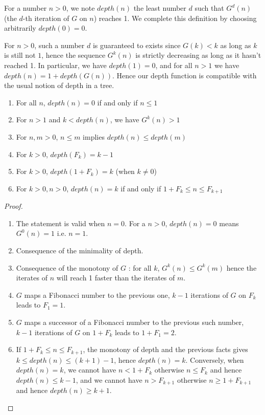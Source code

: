 \documentclass[a4paper,11pt]{article}
\begin{document}
\begin{definition}
For a number $n>0$, we note $depth(n)$ the least number $d$ such that
$G^d(n)$ (the $d$-th iteration of $G$ on $n$) reaches 1.
We complete this definition by choosing arbitrarily $depth(0)=0$.
\end{definition}

For $n>0$, such a number $d$ is guaranteed to exists since $G(k)<k$ as long as
$k$ is still not $1$, hence the sequence $G^k(n)$ is strictly
decreasing as long as it hasn't reached 1.
In particular, we have $depth(1)=0$, and for all $n>1$ we have
$depth(n) = 1+depth(G(n))$. Hence our depth function is compatible
with the usual notion of depth in a tree.

\begin{theorem}\label{depthprops}
\noindent
\begin{enumerate}
\item For all $n$, $depth(n)=0$ if and only if $n\le 1$
\item For $n>1$ and $k<depth(n)$, we have $G^k(n) > 1$
\item For $n,m>0$, $n\le m$ implies $depth(n)\le depth(m)$
\item For $k>0$, $depth(F_k) = k-1$
\item For $k>0$, $depth(1+F_k) = k$ (when $k\neq 0$)
\item For $k>0,n>0$, $depth(n)=k$ if and only if $1+F_k \leq n \leq
  F_{k+1}$
\end{enumerate}
\end{theorem}
\begin{proof}
\noindent
\begin{enumerate}
\item The statement is valid when $n=0$. For a $n>0$, 
$depth(n)=0$ means $G^0(n)=1$ i.e. $n=1$.
\item Consequence of the minimality of depth.
\item Consequence of the monotony of $G$ :
  for all $k$, $G^k(n)\le G^k(m)$ hence the iterates of $n$ will reach
  1 faster than the iterates of $m$.
\item $G$ maps a Fibonacci number to the previous one, $k-1$
  iterations of $G$ on $F_k$ leads to $F_1=1$.
\item $G$ maps a successor of a Fibonacci number to the previous such
  number, $k-1$ iterations of $G$ on $1+F_k$ leads to $1+F_1 = 2$.
\item If $1+F_k \leq n \leq F_{k+1}$, the monotony of depth and the
previous facts gives $k \le depth(n) \le (k+1)-1$, hence $depth(n)=k$.
Conversely, when $depth(n)=k$, we cannot have $n < 1 + F_k$ otherwise
$n \le F_k$ and hence $depth(n)\le k-1$, and we cannot have $n > F_{k+1}$
otherwise $n \ge 1+F_{k+1}$ and hence $depth(n)\ge k+1$.
\end{enumerate}
\end{proof}
\end{document}
